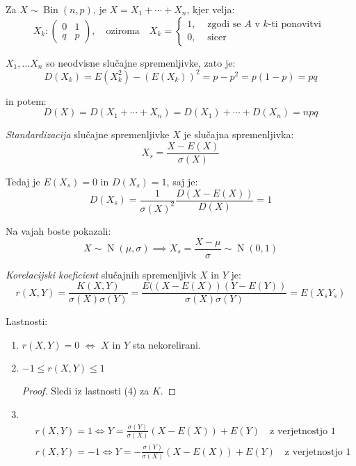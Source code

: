 \documentclass[12pt]{book}
\def\n{\noindent}
\theoremstyle{definition}
\theoremstyle{plain}
\theoremstyle{plain}
\theoremstyle{plain}
\theoremstyle{remark}
\begin{document}
\begin{zgled}
    Za $X \sim \operatorname{Bin}(n,p)$, je $X=X_1+\cdots+X_n$, kjer velja:
    $$
    X_k:\left(\begin{array}{cc} 0 & 1 \\ q & p \end{array}\right), \quad \text{oziroma} \quad X_k= \begin{cases}1, & \text { zgodi se $A$ v $k$-ti ponovitvi } \\ 0, & \text { sicer }\end{cases} 
    $$

    \n $X_1, \ldots X_n$ so neodvisne slučajne spremenljivke, zato je: 
    $$
    D\left(X_k\right)=E\left(X_k^2\right)-\left(E\left(X_k\right)\right)^2=p-p^2=p(1-p)=p q
    $$

    in potem: 
    $$
    D(X)=D\left(X_1+\cdots+X_n\right)=D\left(X_1\right)+\cdots+D\left(X_n\right)=n p q
    $$
\end{zgled}

\n \emph{Standardizacija} slučajne spremenljivke $X$ je slučajna spremenljivka: 
$$
X_s=\frac{X-E(X)}{\sigma(X)}
$$

Tedaj je $E\left(X_s\right)=0$ in $D\left(X_s\right)=1$, saj je: 
$$
D\left(X_s\right)=\frac{1}{\sigma(X)^2} \frac{D(X-E(X))}{D(X)}=1
$$

\begin{zgled}
    Na vajah boste pokazali: 
    $$
    X \sim \operatorname{N}(\mu, \sigma) \implies X_s = \frac{X - \mu}{\sigma} \sim \operatorname{N}(0,1)
    $$  
\end{zgled}

\n \emph{Korelacijski koeficient} slučajnih spremenljivk $X$ in $Y$ je: 
$$
r(X, Y)=\frac{K(X, Y)}{\sigma(X) \sigma(Y)}=\frac{E((X-E(X)) (Y-E(Y))}{\sigma(X) \sigma(Y)} = E(X_s Y_s)
$$

\n Lastnosti: 

\begin{enumerate}
    \item $r(X, Y)=0$ $\iff$ $X$ in $Y$ sta nekorelirani.
    \item $-1 \leq r(X, Y) \leq 1$
    \begin{proof}
        Sledi iz lastnosti (4) za $K$.  
    \end{proof}
    \item ~ \vspace{-31pt}
    $$
    \begin{aligned}
        &r(X, Y)=1 \iff Y=\frac{\sigma(Y)}{\sigma(X)} (X-E(X))+E(Y) \quad \text{z verjetnostjo $1$} \\
        &r(X, Y)=-1 \iff Y=-\frac{\sigma(Y)}{\sigma(X)} (X-E(X))+E(Y) \quad \text{z verjetnostjo $1$}
    \end{aligned}
    $$
\end{enumerate}
\end{document}
